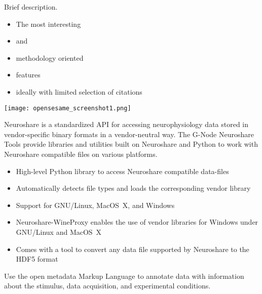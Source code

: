 \begin{multicols}{3}
Brief description.
\begin{itemize}[nolistsep,topsep=0em,leftmargin=1pc]
\item The most interesting
\item and
\item methodology oriented
\item features
\item ideally with limited selection of citations
\end{itemize}
\texttt{[image: opensesame\_screenshot1.png]}



Neuroshare is a standardized API for accessing neurophysiology
data stored in vendor-specific binary formats in a vendor-neutral
way. The G-Node Neuroshare Tools provide libraries and utilities
built on Neuroshare and Python to work with Neuroshare compatible
files on various platforms.

\begin{itemize}[nolistsep,topsep=0em,leftmargin=1pc]
\item High-level Python library to access Neuroshare compatible data-files
\item Automatically detects file types and loads the corresponding vendor library
\item Support for GNU/Linux, MacOS~X, and Windows
\item Neuroshare-WineProxy enables the use of vendor libraries for Windows under GNU/Linux and MacOS~X
\item Comes with a tool to convert any data file supported by Neuroshare to the HDF5 format
\end{itemize}


%


Use the {open metadata Markup Language} to annotate data with information about the stimulus, data acquisition, and experimental conditions.


\end{multicols}
